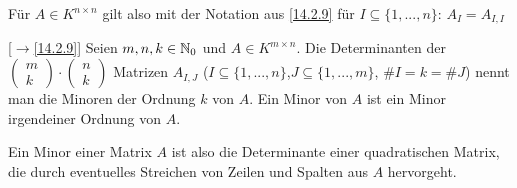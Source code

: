 \documentclass[../../main.tex]{subfiles}
\begin{document}
\begin{bem}\label{17.2.2}
Für $A\in K^{n\times n}$ gilt also mit der Notation aus \ref{14.2.9} für $I\subseteq\{1,...,n\}$: $A_I=A_{I,I}$
\end{bem}

\begin{df}\mbox{}[$\to$\ref{14.2.9}]
\label{17.2.3}
Seien $m,n,k\in \mathbb N_0$ und $A\in K^{m\times n}$. Die Determinanten der $\begin{pmatrix*}m\\k\end{pmatrix*}\cdot\begin{pmatrix*}n\\k\end{pmatrix*}$ Matrizen $A_{I,J}$ ($I\subseteq\{1,...,n\}$,$J\subseteq\{1,...,m\}$, $\# I=k=\# J$) nennt man die Minoren der Ordnung $k$ von $A$. Ein Minor von  $A$ ist ein Minor irgendeiner Ordnung von $A$.
\end{df}

\begin{bem}\label{17.2.4}
Ein Minor einer Matrix $A$ ist also die Determinante einer quadratischen Matrix, die durch eventuelles Streichen von Zeilen und Spalten aus $A$ hervorgeht.
\end{bem}
\end{document}
